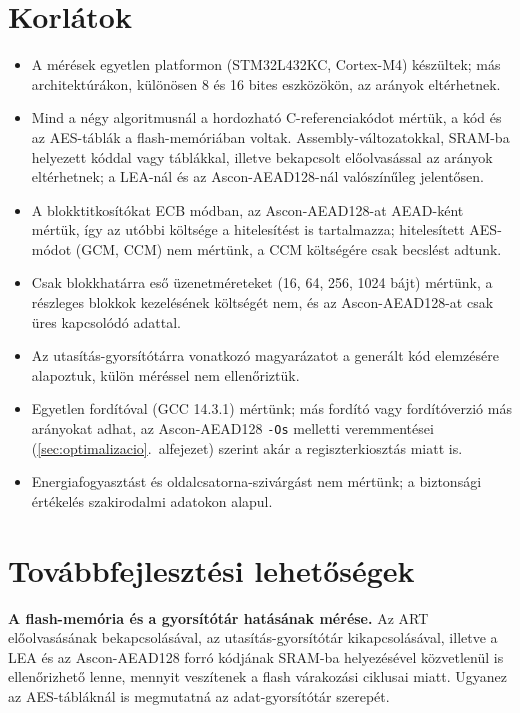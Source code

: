\documentclass[a4paper,12pt]{report}
\theoremstyle{definition}
\theoremstyle{remark}
\begin{document}
\section{Korlátok}

\begin{itemize}
	\item A mérések egyetlen platformon (STM32L432KC, Cortex-M4) készültek; más architektúrákon, különösen 8 és 16 bites eszközökön, az arányok eltérhetnek.
	\item Mind a négy algoritmusnál a hordozható C-referenciakódot mértük, a kód és az AES-táblák a flash-memóriában voltak. Assembly-változatokkal, SRAM-ba helyezett kóddal vagy táblákkal, illetve bekapcsolt előolvasással az arányok eltérhetnek; a LEA-nál és az Ascon-AEAD128-nál valószínűleg jelentősen.
	\item A blokktitkosítókat ECB módban, az Ascon-AEAD128-at AEAD-ként mértük, így az utóbbi költsége a hitelesítést is tartalmazza; hitelesített AES-módot (GCM, CCM) nem mértünk, a CCM költségére csak becslést adtunk.
	\item Csak blokkhatárra eső üzenetméreteket (16, 64, 256, 1024 bájt) mértünk, a részleges blokkok kezelésének költségét nem, és az Ascon-AEAD128-at csak üres kapcsolódó adattal.
	\item Az utasítás-gyorsítótárra vonatkozó magyarázatot a generált kód elemzésére alapoztuk, külön méréssel nem ellenőriztük.
	\item Egyetlen fordítóval (GCC 14.3.1) mértünk; más fordító vagy fordítóverzió más arányokat adhat, az Ascon-AEAD128 \texttt{-Os} melletti veremmentései (\ref{sec:optimalizacio}.~alfejezet) szerint akár a regiszterkiosztás miatt is.
	\item Energiafogyasztást és oldalcsatorna-szivárgást nem mértünk; a biztonsági értékelés szakirodalmi adatokon alapul.
\end{itemize}

\section{Továbbfejlesztési lehetőségek}\label{sec:tovabbfejlesztes}

\textbf{A flash-memória és a gyorsítótár hatásának mérése.} Az ART előolvasásának bekapcsolásával, az utasítás-gyorsítótár kikapcsolásával, illetve a LEA és az Ascon-AEAD128 forró kódjának SRAM-ba helyezésével közvetlenül is ellenőrizhető lenne, mennyit veszítenek a flash várakozási ciklusai miatt. Ugyanez az AES-tábláknál is megmutatná az adat-gyorsítótár szerepét.
\end{document}
